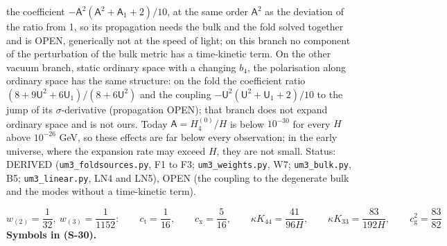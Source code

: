 \documentclass[
  10pt,
]{article}
\begin{document}
the coefficient \(-\mathsf{A}^2(\mathsf{A}^2 + \mathsf{A}_1 + 2)/10\),
at the same order \(\mathsf{A}^2\) as the deviation of the ratio from 1,
so its propagation needs the bulk and the fold solved together and is
OPEN, generically not at the speed of light; on this branch no component
of the perturbation of the bulk metric has a time-kinetic term. On the
other vacuum branch, static ordinary space with a changing \(b_4\), the
polarisation along ordinary space has the same structure: on the fold
the coefficient ratio
\((8 + 9\mathsf{U}^2 + 6\mathsf{U}_1)/(8 + 6\mathsf{U}^2)\) and the
coupling \(-\mathsf{U}^2(\mathsf{U}^2 + \mathsf{U}_1 + 2)/10\) to the
jump of its \(\sigma\)-derivative (propagation OPEN); that branch does
not expand ordinary space and is not ours. Today
\(\mathsf{A} = H_4^{(0)}/H\) is below \(10^{-30}\) for every \(H\) above
\(10^{-26}\) GeV, so these effects are far below every observation; in
the early universe, where the expansion rate may exceed \(H\), they are
not small. Status: DERIVED (\texttt{um3\_foldsources.py}, F1 to F3;
\texttt{um3\_weights.py}, W7; \texttt{um3\_bulk.py}, B5;
\texttt{um3\_linear.py}, LN4 and LN5), OPEN (the coupling to the
degenerate bulk and the modes without a time-kinetic term).

\[
w_{(2)} = \frac{1}{32},\ w_{(3)} = \frac{1}{1152}:\qquad c_{\mathrm{t}} = \frac{1}{16},\qquad c_{\mathrm{x}} = \frac{5}{16},\qquad
\kappa K_{44} = \frac{41}{96H},\qquad \kappa K_{33} = \frac{83}{192H},\qquad c_{\mathrm{g}}^2 = \frac{83}{82} \tag{S-30}
\] \textbf{Symbols in (S-30).}
\end{document}
